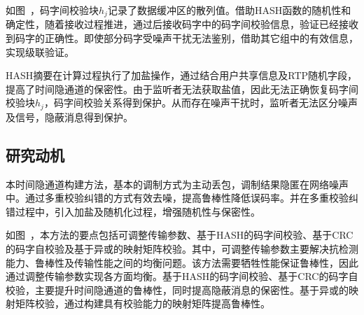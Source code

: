 如图\ ，码字间校验块$h_{j}$记录了数据缓冲区的散列值。借助HASH函数的随机性和确定性，随着接收过程推进，通过后接收码字中的码字间校验信息，验证已经接收到码字的正确性。即使部分码字受噪声干扰无法鉴别，借助其它组中的有效信息，实现级联验证。

HASH摘要在计算过程执行了加盐操作，通过结合用户共享信息及RTP随机字段，提高了时间隐通道的保密性。由于监听者无法获取盐值，因此无法正确恢复码字间校验块$h_{j}$，码字间校验关系得到保护。从而存在噪声干扰时，监听者无法区分噪声及信号，隐蔽消息得到保护。

\subsection{研究动机}
\label{chap:hash:motivation:motivation}

本时间隐通道构建方法，基本的调制方式为主动丢包，调制结果隐匿在网络噪声中。通过多重校验纠错的方式有效去噪，提高鲁棒性降低误码率。并在多重校验纠错过程中，引入加盐及随机化过程，增强随机性与保密性。


如图\ ，本方法的要点包括可调整传输参数、基于HASH的码字间校验、基于CRC的码字自校验及基于异或的映射矩阵校验。其中，可调整传输参数主要解决抗检测能力、鲁棒性及传输性能之间的均衡问题。该方法需要牺牲性能保证鲁棒性，因此通过调整传输参数实现各方面均衡。基于HASH的码字间校验、基于CRC的码字自校验，主要提升时间隐通道的鲁棒性，同时提高隐蔽消息的保密性。基于异或的映射矩阵校验，通过构建具有校验能力的映射矩阵提高鲁棒性。